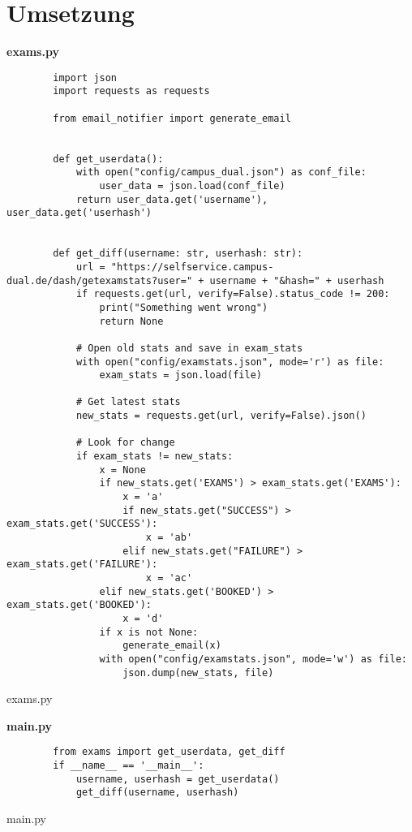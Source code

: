\newpage
\section{Umsetzung}
\textbf{exams.py}
\begin{code}[H]
    \begin{verbatim}
        import json
        import requests as requests
        
        from email_notifier import generate_email
        
        
        def get_userdata():
            with open("config/campus_dual.json") as conf_file:
                user_data = json.load(conf_file)
            return user_data.get('username'), user_data.get('userhash')
        
        
        def get_diff(username: str, userhash: str):
            url = "https://selfservice.campus-dual.de/dash/getexamstats?user=" + username + "&hash=" + userhash
            if requests.get(url, verify=False).status_code != 200:
                print("Something went wrong")
                return None
        
            # Open old stats and save in exam_stats
            with open("config/examstats.json", mode='r') as file:
                exam_stats = json.load(file)
        
            # Get latest stats
            new_stats = requests.get(url, verify=False).json()
        
            # Look for change
            if exam_stats != new_stats:
                x = None
                if new_stats.get('EXAMS') > exam_stats.get('EXAMS'):
                    x = 'a'
                    if new_stats.get("SUCCESS") > exam_stats.get('SUCCESS'):
                        x = 'ab'
                    elif new_stats.get("FAILURE") > exam_stats.get('FAILURE'):
                        x = 'ac'
                elif new_stats.get('BOOKED') > exam_stats.get('BOOKED'):
                    x = 'd'
                if x is not None:
                    generate_email(x)
                with open("config/examstats.json", mode='w') as file:
                    json.dump(new_stats, file)
    \end{verbatim}
    \caption[exams.py]{exams.py}
    \label{exams.py}
\end{code}

\textbf{main.py}
\begin{code}[H]
    \begin{verbatim}
        from exams import get_userdata, get_diff
        if __name__ == '__main__':
            username, userhash = get_userdata()
            get_diff(username, userhash)
    \end{verbatim}
    \caption[main.py]{main.py}
    \label{main.py}
\end{code}

